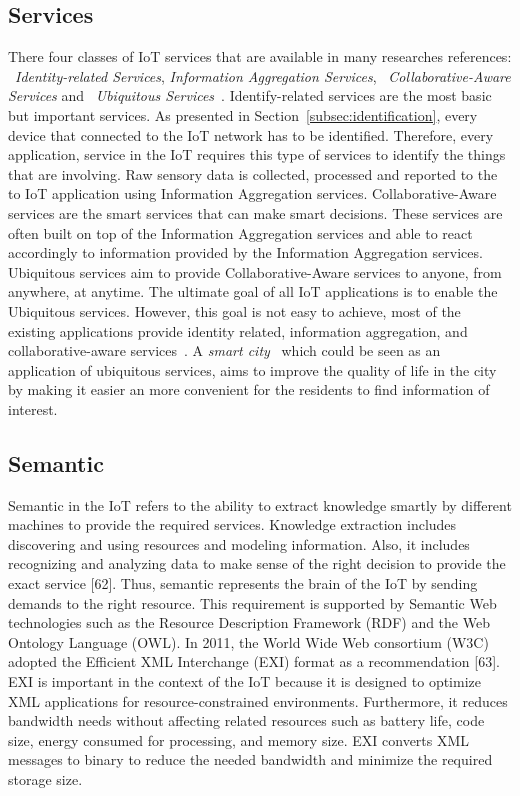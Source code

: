 \subsection{Services}

There four classes of IoT services that are available in many researches references: ~\textit{Identity-related Services}, \textit{Information Aggregation Services}, ~\textit{Collaborative-Aware Services} and ~\textit{Ubiquitous Services}~\citep{Mohammed:2015}.
Identify-related services are the most basic but important services. 
As presented in Section~\ref{subsec:identification}, every device that connected to the IoT network has to be identified.
Therefore, every application, service in the IoT requires this type of services to identify the things that are involving. 
Raw sensory data is collected, processed and reported to the to IoT application using Information Aggregation services. 
Collaborative-Aware services are the smart services that can make smart decisions.
These services are often built on top of the Information Aggregation services and able to react accordingly to information provided by the Information Aggregation services.
Ubiquitous services aim to provide Collaborative-Aware services to anyone, from anywhere, at anytime.
The ultimate goal of all IoT applications is to enable the Ubiquitous services.
However, this goal is not easy to achieve, most of the existing applications provide identity related, information aggregation, and collaborative-aware services~\citep{Al-Fuqaha:2015}.
A \textit{smart city}~\citep{Jin:2014, Zanella:2014} which could be seen as an application of ubiquitous services, aims to improve the quality of life in the city by making it easier an more convenient for the residents to find information of interest.

\subsection{Semantic}

Semantic in the IoT refers to the ability to extract knowledge smartly by different machines to provide the required services.
Knowledge extraction includes discovering and using resources and modeling information.
Also, it includes recognizing and analyzing data to make sense of the right decision to provide the exact service [62]. 
Thus, semantic represents the brain of the IoT by sending demands to the right resource. 
This requirement is supported by Semantic Web technologies such as the Resource Description Framework (RDF) and the Web Ontology
Language (OWL).
In 2011, the World Wide Web consortium (W3C) adopted the Efficient XML Interchange (EXI) format as a recommendation [63].
EXI is important in the context of the IoT because it is designed to optimize XML applications for resource-constrained environments. 
Furthermore, it reduces bandwidth needs without affecting related resources such as battery life, code size, energy consumed for processing, and memory size. 
EXI converts XML messages to binary to reduce the needed bandwidth and minimize the required storage size.



